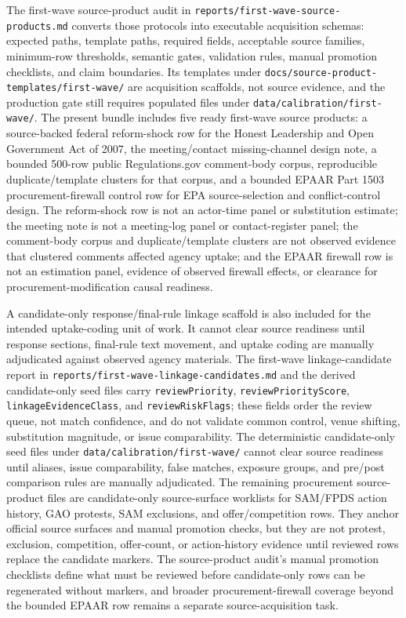 The first-wave source-product audit in \texttt{reports/first-wave-source-products.md} converts those protocols into executable acquisition schemas: expected paths, template paths, required fields, acceptable source families, minimum-row thresholds, semantic gates, validation rules, manual promotion checklists, and claim boundaries. Its templates under \texttt{docs/source-product-templates/first-wave/} are acquisition scaffolds, not source evidence, and the production gate still requires populated files under \texttt{data/calibration/first-wave/}. The present bundle includes five ready first-wave source products: a source-backed federal reform-shock row for the Honest Leadership and Open Government Act of 2007, the meeting/contact missing-channel design note, a bounded 500-row public Regulations.gov comment-body corpus, reproducible duplicate/template clusters for that corpus, and a bounded EPAAR Part 1503 procurement-firewall control row for EPA source-selection and conflict-control design. The reform-shock row is not an actor-time panel or substitution estimate; the meeting note is not a meeting-log panel or contact-register panel; the comment-body corpus and duplicate/template clusters are not observed evidence that clustered comments affected agency uptake; and the EPAAR firewall row is not an estimation panel, evidence of observed firewall effects, or clearance for procurement-modification causal readiness.

A candidate-only response/final-rule linkage scaffold is also included for the intended uptake-coding unit of work. It cannot clear source readiness until response sections, final-rule text movement, and uptake coding are manually adjudicated against observed agency materials. The first-wave linkage-candidate report in \texttt{reports/first-wave-linkage-candidates.md} and the derived candidate-only seed files carry \texttt{reviewPriority}, \texttt{reviewPriorityScore}, \texttt{linkageEvidenceClass}, and \texttt{reviewRiskFlags}; these fields order the review queue, not match confidence, and do not validate common control, venue shifting, substitution magnitude, or issue comparability. The deterministic candidate-only seed files under \texttt{data/calibration/first-wave/} cannot clear source readiness until aliases, issue comparability, false matches, exposure groups, and pre/post comparison rules are manually adjudicated. The remaining procurement source-product files are candidate-only source-surface worklists for SAM/FPDS action history, GAO protests, SAM exclusions, and offer/competition rows. They anchor official source surfaces and manual promotion checks, but they are not protest, exclusion, competition, offer-count, or action-history evidence until reviewed rows replace the candidate markers. The source-product audit's manual promotion checklists define what must be reviewed before candidate-only rows can be regenerated without markers, and broader procurement-firewall coverage beyond the bounded EPAAR row remains a separate source-acquisition task.

